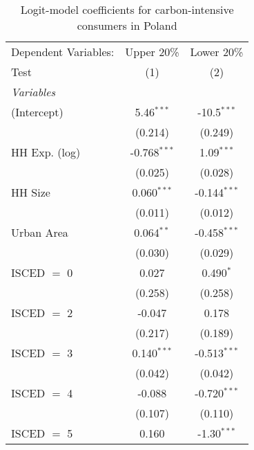 
\begin{table}[htbp!]
   \centering
   \small
   \begin{adjustbox}{width = 1\textwidth, max height = 0.95\textheight, center}
      \begin{threeparttable}[b]
         \caption{\label{tab:Logit_1_POL} Logit-model coefficients for carbon-intensive consumers in Poland}
         \begin{tabular}{lcc}
            \tabularnewline \midrule \midrule
            Dependent Variables: & Upper 20\%     & Lower 20\%\\   
            Test                 & (1)            & (2)\\  
            \midrule
            \emph{Variables}\\
            (Intercept)          & 5.46$^{***}$   & -10.5$^{***}$\\   
                                 & (0.214)        & (0.249)\\   
            HH Exp. (log)        & -0.768$^{***}$ & 1.09$^{***}$\\   
                                 & (0.025)        & (0.028)\\   
            HH Size              & 0.060$^{***}$  & -0.144$^{***}$\\   
                                 & (0.011)        & (0.012)\\   
            Urban Area           & 0.064$^{**}$   & -0.458$^{***}$\\   
                                 & (0.030)        & (0.029)\\   
            ISCED $=$ 0          & 0.027          & 0.490$^{*}$\\   
                                 & (0.258)        & (0.258)\\   
            ISCED $=$ 2          & -0.047         & 0.178\\   
                                 & (0.217)        & (0.189)\\   
            ISCED $=$ 3          & 0.140$^{***}$  & -0.513$^{***}$\\   
                                 & (0.042)        & (0.042)\\   
            ISCED $=$ 4          & -0.088         & -0.720$^{***}$\\   
                                 & (0.107)        & (0.110)\\   
            ISCED $=$ 5          & 0.160          & -1.30$^{***}$\\   

\end{tabular}
\end{threeparttable}
\end{adjustbox}
\end{table}
